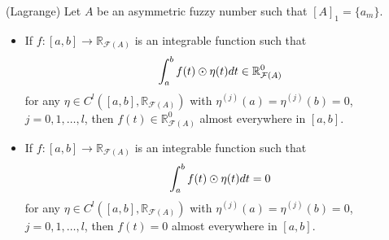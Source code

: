 \documentclass[10pt,a4paper]{amsart}
\newcommand{\RFA}{\mathbb{R}_{\mathcal{F}(A)}}
\begin{document}
\begin{lemma}(Lagrange)\label{lem:fundamental1}
Let $A$ be an asymmetric fuzzy number such that $[A]_1 = \{a_m\}$. 
\begin{itemize}
\item[(i)] If $f:[a,b]\longrightarrow\RFA$ is an integrable function such that  
\begin{equation}\label{eq:fundamental1a}
\int_{a}^{b} f(t)\odot\eta(t)\textnormal{d}t \in \RFA^0	
\end{equation}
for any $\eta \in C^{l}\left([a,b],\RFA\right)$ with $\eta^{(j)}(a)=\eta^{(j)}(b)=0$, $j=0,1,\dots,l$, then 
$f(t) \in \RFA^0$ almost everywhere in $[a,b].$

 \item[(ii)] If $f:[a,b]\longrightarrow\RFA$ is an integrable function such that  
\begin{equation}\label{eq:fundamental1b}
\int_{a}^{b} f(t)\odot\eta(t)\textnormal{d}t=0	
\end{equation}
for any $\eta \in C^{l}\left([a,b],\RFA\right)$ with $\eta^{(j)}(a)=\eta^{(j)}(b)=0$, $j=0,1,\dots,l$, then 
$f(t) = 0$ almost everywhere in $[a,b].$
\end{itemize}
\end{lemma}
\end{document}
